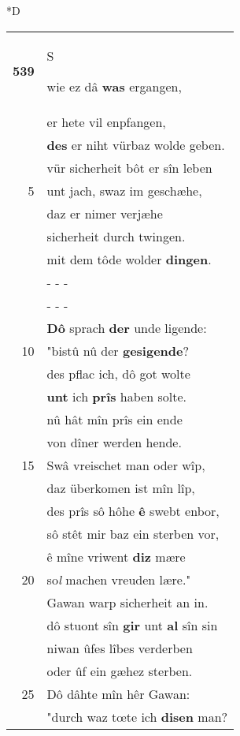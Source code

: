 \documentclass[8pt,a4paper,notitlepage]{article}
\begin{document}
\begin{table}[ht]
\begin{minipage}[t]{0.5\linewidth}
\small
\begin{center}*D
\end{center}
\begin{tabular}{rl}
\textbf{539} & \begin{large}S\end{large}wie ez dâ \textbf{was} ergangen,\\ 
 & er hete vil enpfangen,\\ 
 & \textbf{des} er niht vürbaz wolde geben.\\ 
 & vür sicherheit bôt er sîn leben\\ 
5 & unt jach, swaz im geschæhe,\\ 
 & daz er nimer verjæhe\\ 
 & sicherheit durch twingen.\\ 
 & mit dem tôde wolder \textbf{dingen}.\\ 
 & \multicolumn{1}{l}{ - - - }\\ 
 & \multicolumn{1}{l}{ - - - }\\ 
 & \textbf{Dô} sprach \textbf{der} unde ligende:\\ 
10 & "bistû nû der \textbf{gesigende}?\\ 
 & des pflac ich, dô got wolte\\ 
 & \textbf{unt} ich \textbf{prîs} haben solte.\\ 
 & nû hât mîn prîs ein ende\\ 
 & von dîner werden hende.\\ 
15 & Swâ vreischet man oder wîp,\\ 
 & daz überkomen ist mîn lîp,\\ 
 & des prîs sô hôhe \textbf{ê} swebt enbor,\\ 
 & sô stêt mir baz ein sterben vor,\\ 
 & ê mîne vriwent \textbf{diz} mære\\ 
20 & so\textit{l} machen vreuden lære."\\ 
 & Gawan warp sicherheit an in.\\ 
 & dô stuont sîn \textbf{gir} unt \textbf{al} sîn sin\\ 
 & niwan ûfes lîbes verderben\\ 
 & oder ûf ein gæhez sterben.\\ 
25 & Dô dâhte mîn hêr Gawan:\\ 
 & "durch waz tœte ich \textbf{disen} man?\\ 

\end{tabular}
\end{minipage}
\end{table}
\end{document}
